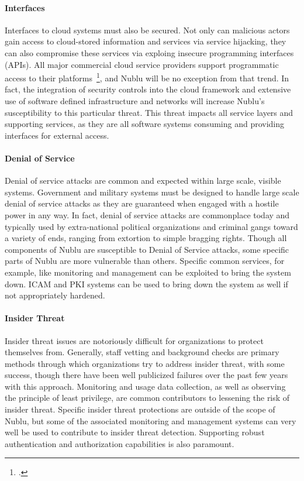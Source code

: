 \documentclass[10pt,letterpaper]{article}
\begin{document}
\paragraph{Interfaces} Interfaces to cloud systems must also be secured.  Not only can malicious actors gain access to cloud-stored information and services via service hijacking, they can also compromise these services via exploing insecure programming interfaces (APIs).  All major commercial cloud service providers support programmatic access to their platforms~\footcite{rackspace-api:13,amazon-api:13}, and Nublu will be no exception from that trend.  In fact, the integration of security controls into the cloud framework and extensive use of software defined infrastructure and networks will increase Nublu's susceptibility to this particular threat.  This threat impacts all service layers and supporting services, as they are all software systems consuming and providing interfaces for external access.

\paragraph{Denial of Service} Denial of service attacks are common and expected within large scale, visible systems.  Government and military systems must be designed to handle large scale denial of service attacks as they are guaranteed when engaged with a hostile power in any way.  In fact, denial of service attacks are commonplace today and typically used by extra-national political organizations and criminal gangs toward a variety of ends, ranging from extortion to simple bragging rights.  Though all components of Nublu are susceptible to Denial of Service attacks, some specific parts of Nublu are more vulnerable than others.  Specific common services, for example, like monitoring and management can be exploited to bring the system down.  ICAM and PKI systems can be used to bring down the system as well if not appropriately hardened.

\paragraph{Insider Threat} Insider threat issues are notoriously difficult for organizations to protect themselves from.  Generally, staff vetting and background checks are primary methods through which organizations try to address insider threat, with some success, though there have been well publicized failures over the past few years with this approach.  Monitoring and usage data collection, as well as observing the principle of least privilege, are common contributors to lessening the risk of insider threat.  Specific insider threat protections are outside of the scope of Nublu, but some of the associated monitoring and management systems can very well be used to contribute to insider threat detection.  Supporting robust authentication and authorization capabilities is also paramount.
\end{document}

